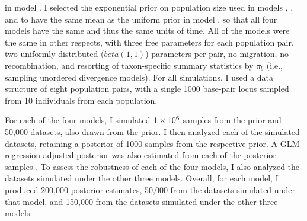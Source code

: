 in model \modelOld.
I selected the exponential prior on population size used in models \modelDPP,
\modelUniform, and \modelUniform to have the same mean as the uniform prior in
model \modelOld, so that all four models have the same  and thus the
same units of time.
All of the models were the same in other respects, with three free \myTheta{}
parameters for each population pair, two uniformly distributed ($beta(1,1)$)
\bottleScalar{}{} parameters per pair, no migration, no recombination, and
resorting of taxon-specific summary statistics by $\pi_b$ (i.e., sampling
unordered divergence models).
For all simulations, I used a data structure of eight population pairs, with a
single 1000 base-pair locus sampled from 10 individuals from each population.

For each of the four models, I simulated $1\times 10^{6}$ samples from the prior and
50,000 datasets, also drawn from the prior.
I then analyzed each of the simulated datasets, retaining a
posterior of 1000 samples from the respective prior.
A GLM-regression adjusted posterior was also estimated from each of the
posterior samples \cite{Leuenberger2010}.
To assess the robustness of each of the four models, I also analyzed the
datasets simulated under the other three models.
Overall, for each model, I produced 200,000 posterior estimates,
50,000 from the datasets simulated under that model,
and 150,000 from the datasets simulated under the
other three models.

